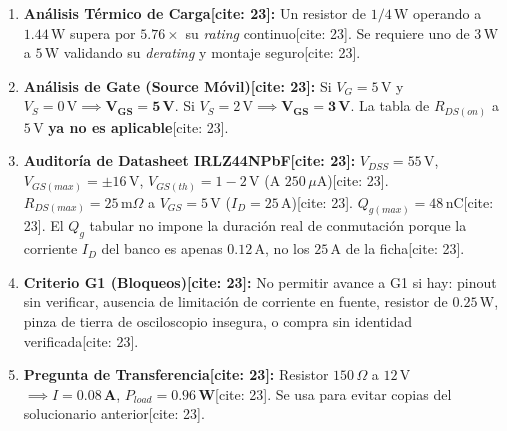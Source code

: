 \documentclass[11pt, a4paper]{article}
\begin{document}
\begin{enumerate}
    \item \textbf{Análisis Térmico de Carga[cite: 23]:}
    Un resistor de $1/4\,\text{W}$ operando a $1.44\,\text{W}$ supera por $5.76\times$ su \textit{rating} continuo[cite: 23]. Se requiere uno de $3\,\text{W}$ a $5\,\text{W}$ validando su \textit{derating} y montaje seguro[cite: 23].
    
    \item \textbf{Análisis de Gate (Source Móvil)[cite: 23]:}
    Si $V_G = 5\,\text{V}$ y $V_S = 0\,\text{V} \implies \mathbf{V_{GS} = 5\,\text{V}}$. 
    Si $V_S = 2\,\text{V} \implies \mathbf{V_{GS} = 3\,\text{V}}$. La tabla de $R_{DS(on)}$ a $5\,\text{V}$ \textbf{ya no es aplicable}[cite: 23].
    
    \item \textbf{Auditoría de Datasheet IRLZ44NPbF[cite: 23]:}
    $V_{DSS} = 55\,\text{V}$, $V_{GS(max)} = \pm 16\,\text{V}$, $V_{GS(th)} = 1-2\,\text{V}$ (A $250\,\mu\text{A}$)[cite: 23]. 
    $R_{DS(max)} = 25\,\text{m}\Omega$ a $V_{GS}=5\,\text{V}$ ($I_D=25\,\text{A}$)[cite: 23]. $Q_{g(max)} = 48\,\text{nC}$[cite: 23]. 
    El $Q_g$ tabular no impone la duración real de conmutación porque la corriente $I_D$ del banco es apenas $0.12\,\text{A}$, no los $25\,\text{A}$ de la ficha[cite: 23].
    
    \item \textbf{Criterio G1 (Bloqueos)[cite: 23]:}
    No permitir avance a G1 si hay: pinout sin verificar, ausencia de limitación de corriente en fuente, resistor de $0.25\,\text{W}$, pinza de tierra de osciloscopio insegura, o compra sin identidad verificada[cite: 23].
    
    \item \textbf{Pregunta de Transferencia[cite: 23]:} 
    Resistor $150\,\Omega$ a $12\,\text{V}$ $\implies I = \mathbf{0.08\,\text{A}}$, $P_{load} = \mathbf{0.96\,\text{W}}$[cite: 23]. Se usa para evitar copias del solucionario anterior[cite: 23].
\end{enumerate}
\end{document}
